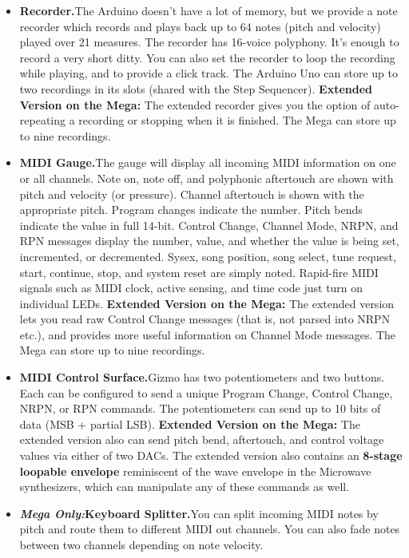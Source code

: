 \documentclass{article}
\begin{document}
\begin{itemize}
\item {\bf Recorder.}\quad The Arduino doesn't have a lot of memory, but we provide a note recorder which records and plays back up to 64 notes (pitch and velocity) played over 21 measures. The recorder has 16-voice polyphony.   It's enough to record a very short ditty.  You can also set the recorder to loop the recording while playing, and to provide a click track.  The Arduino Uno can store up to two recordings in its slots (shared with the Step Sequencer).   {\bf Extended Version on the Mega:}  The extended recorder gives you the option of auto-repeating a recording or stopping when it is finished.  The Mega can store up to nine recordings.

\item {\bf MIDI Gauge.}\quad The gauge will display all incoming MIDI information on one or all channels.  Note on, note off, and polyphonic aftertouch are shown with pitch and velocity (or pressure).  Channel aftertouch is shown with the appropriate pitch.  Program changes indicate the number.  Pitch bends indicate the value in full 14-bit.  Control Change, Channel Mode, NRPN, and RPN messages display the number, value, and whether the value is being set, incremented, or decremented.  Sysex, song position, song select, tune request, start, continue, stop, and system reset are simply noted.  Rapid-fire MIDI signals such as MIDI clock, active sensing, and time code just turn on individual LEDs. {\bf Extended Version on the Mega:}  The extended version lets you read raw Control Change messages (that is, not parsed into NRPN etc.), and provides more useful information on Channel Mode messages.  The Mega can store up to nine recordings.

\item {\bf MIDI Control Surface.}\quad Gizmo has two potentiometers and two buttons.  Each can be configured to send a unique Program Change, Control Change, NRPN, or RPN commands.  The potentiometers can send up to 10 bits of data (MSB + partial LSB).   {\bf Extended Version on the Mega:}  The extended version also can send pitch bend, aftertouch, and control voltage values via either of two DACs.   The extended version also contains an {\bf 8-stage loopable envelope} reminiscent of the wave envelope in the Microwave synthesizers, which can manipulate any of these commands as well.

\item {\bf \textit{Mega Only:}\quad Keyboard Splitter.}\quad You can split incoming MIDI notes by pitch and route them to different MIDI out channels.  You can also fade notes between two channels depending on note velocity.


\end{itemize}
\end{document}
